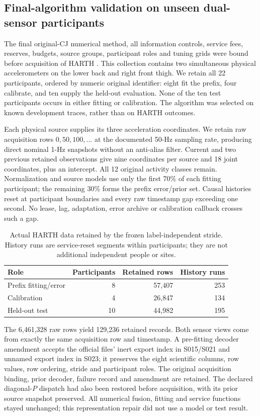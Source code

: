 \documentclass[10pt]{article}
\begin{document}
\subsection{Final-algorithm validation on unseen dual-sensor participants}
\label{sec:harth-frozen-validation}
The final original-CJ numerical method, all information controls, service
fees, reserves, budgets, source groups, participant roles and tuning grids
were bound before acquisition of HARTH \cite{harth779}. This collection
contains two simultaneous physical accelerometers on the lower back and
right front thigh. We retain all 22 participants, ordered by numeric
original identifier: eight fit the prefix, four calibrate, and ten supply
the held-out evaluation. None of the ten test participants occurs in either
fitting or calibration. The algorithm was selected on known development
traces, rather than on HARTH outcomes.

Each physical source supplies its three acceleration coordinates. We
retain raw acquisition rows $0,50,100,\ldots$ at the documented 50-Hz
sampling rate, producing direct nominal 1-Hz snapshots without an
anti-alias filter. Current and two previous retained observations give
nine coordinates per source and 18 joint coordinates, plus an intercept.
All 12 original activity classes remain. Normalization and source models
use only the first 70\% of each fitting participant; the remaining 30\%
forms the prefix error/prior set. Causal histories reset at participant
boundaries and every raw timestamp gap exceeding one second. No lease,
lag, adaptation, error archive or calibration callback crosses such a gap.

\begin{table}[t]
\centering\small
\caption{Actual HARTH data retained by the frozen label-independent stride.
History runs are service-reset segments within participants; they are not
additional independent people or sites.}
\label{tab:harth-data}
\begin{tabular}{lrrr}
\toprule
Role & Participants & Retained rows & History runs\\
\midrule
Prefix fitting/error & 8 & 57,407 & 253\\
Calibration & 4 & 26,847 & 134\\
Held-out test & 10 & 44,982 & 195\\
\bottomrule
\end{tabular}
\end{table}

The 6,461,328 raw rows yield 129,236 retained records. Both sensor views
come from exactly the same acquisition row and timestamp. A pre-fitting
decoder amendment accepts the official files' inert export index in
S015/S021 and unnamed export index in S023; it preserves the eight
scientific columns, row values, row ordering, stride and participant roles.
The original acquisition binding, prior decoder, failure record and amendment
are retained. The declared diagonal-$P$ dispatch had also been restored
before acquisition, with its prior source snapshot preserved.
All numerical fusion, fitting and service functions stayed
unchanged; this representation repair did not use a model or test result.
\end{document}
